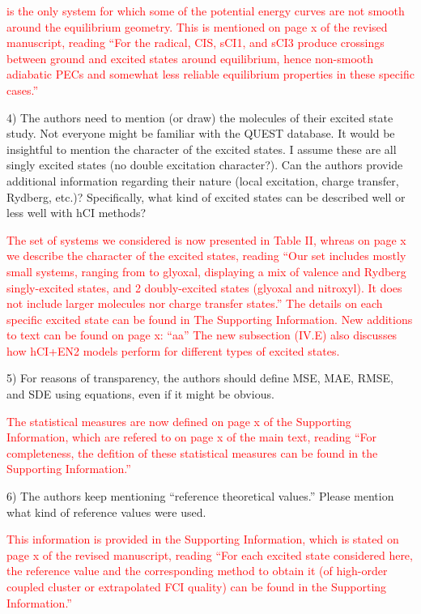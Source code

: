 \documentclass[10pt]{letter}
\newcommand{\alert}[1]{\textcolor{red}{#1}}
\begin{document}
\begin{letter}
\alert{
 is the only system for which some of the potential energy curves are not smooth around the equilibrium geometry.
This is mentioned on page x of the revised manuscript, reading
``For the \ce{CN} radical, CIS, sCI1, and sCI3 produce crossings between ground and excited states around equilibrium, hence non-smooth adiabatic PECs
and somewhat less reliable equilibrium properties in these specific cases.''
}

{4) The authors need to mention (or draw) the molecules of their excited state study. Not everyone might be familiar with the QUEST database. It would be insightful to mention the character of the excited states. I assume these are all singly excited states (no double excitation character?). Can the authors provide additional information regarding their nature (local excitation, charge transfer, Rydberg, etc.)? Specifically, what kind of excited states can be described well or less well with hCI methods?
}

\alert{
The set of systems we considered is now presented in Table II, whreas on page x we describe the character of the excited states, reading
``Our set includes mostly small systems, ranging from \ce{BH} to glyoxal, displaying a mix of valence and Rydberg singly-excited states,
and 2 doubly-excited states (glyoxal and nitroxyl). It does not include larger molecules nor charge transfer states.''
The details on each specific excited state can be found in The Supporting Information.
New additions to text can be found on page x:
``aa''
The new subsection (IV.E) also discusses how hCI+EN2 models perform for different types of excited states.
}

\clearpage

{5) For reasons of transparency, the authors should define MSE, MAE, RMSE, and SDE using equations, even if it might be obvious.
}

\alert{
The statistical measures are now defined on page x of the Supporting Information, which are refered to on page x of the main text, reading
``For completeness, the defition of these statistical measures can be found in the Supporting Information.''
}

{6) The authors keep mentioning ``reference theoretical values.'' Please mention what kind of reference values were used.
}

\alert{
This information is provided in the Supporting Information, which is stated on page x of the revised manuscript, reading
``For each excited state considered here, the reference value and the corresponding method to obtain it (of high-order coupled cluster or extrapolated FCI quality) can be found in the Supporting Information.''
}


\end{letter}
\end{document}
